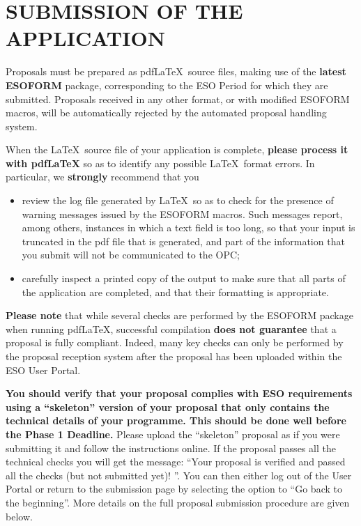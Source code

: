 \documentclass{article}
\begin{document}

\section{SUBMISSION OF THE APPLICATION}
\label{sec:submission}

Proposals must be prepared as pdf\LaTeX\ source files, making use of
the {\bf latest ESOFORM} package, corresponding to the ESO Period
for which they are submitted.  Proposals received in
any other format, or with modified ESOFORM macros, will be
automatically rejected by the automated proposal handling system.

When the \LaTeX\ source file of your application is complete, {\bf
  please process it with pdf\LaTeX} so as to identify any
possible \LaTeX\ format errors. In particular, we {\bf strongly}
recommend that you
\begin{itemize} 
\item review the log file generated by \LaTeX\ so as to
  check for the presence of warning messages issued by the ESOFORM
  macros. Such messages report, among others, instances in which a text
  field is too long, so that your input is truncated in the pdf file
  that is generated, and part of the information that you
  submit will not be communicated to the OPC;
\item carefully inspect a printed copy of the output to make sure that
  all parts of the application are completed, and that their
  formatting is appropriate.
\end{itemize} 

{\bf Please note} that while several checks are
performed by the ESOFORM package when running pdf\LaTeX, successful 
compilation  {\bf does not guarantee} that a proposal is
fully compliant. Indeed, many key  checks 
can only be performed by the proposal reception system after the proposal
has been uploaded within the ESO User Portal.

{\bf You should verify that your proposal complies with ESO
requirements using a ``skeleton'' version of  your proposal that
only contains the technical details of your  programme. This should be done well before the Phase 1 Deadline.}
 Please upload the ``skeleton'' proposal as if you were submitting it and follow the instructions online.
If the proposal passes all the technical checks you will get the message:
``Your proposal is verified and passed all the checks (but not submitted yet)!
''. You can then either log out of the User Portal or 
return to the submission page by selecting the option to 
``Go back to the beginning''. 
More details on the full proposal submission procedure are given below.
\end{document}
